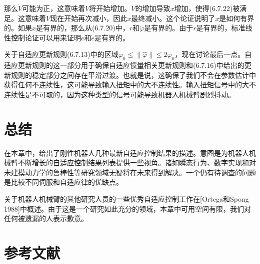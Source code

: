 \documentclass[12pt,a4paper]{ctexart}
\begin{document}
那么$\dot{V}$可能为正，这意味着$V$将开始增加。$V$的增加导致$x$增加，使得(6.7.22)被满足。这意味着$V$现在开始再次减小，因此$x$最终减小。这个论证说明了$x$是如何有界的。如果$x$是有界的，那么从(6.7.20)中，$r$和$\tilde{\varphi}$是有界的。由于$r$是有界的，标准线性控制论证可以用来证明$e$和$\dot{e}$是有界的。

关于自适应更新规则(6.7.13)中的区域$\varphi_0 \leq \|\hat{\varphi}\| \leq 2\varphi_0$，现在讨论最后一点。自适应更新规则的这一部分用于确保自适应惯量相关更新规则和(6.7.16)中给出的更新规则的稳定部分之间存在平滑过渡。也就是说，这确保了我们不会在参数估计中获得任何不连续性，这可能导致输入扭矩中的大不连续性。输入扭矩信号中的大不连续性是不可取的，因为这种类型的信号可能导致机器人机械臂剧烈抖动。

\section{总结}\label{sec:summary}

在本章中，给出了刚性机器人几种最新自适应控制结果的描述。意图是为机器人机械臂不断增长的自适应控制结果列表提供一些视角。诸如瞬态行为、数字实现和对未建模动力学的鲁棒性等研究领域无疑将在未来得到解决。一个仍有待调查的问题是比较不同伺服和自适应律的优缺点。

关于机器人机械臂的其他研究人员的一些优秀自适应控制工作在[Ortega和Spong 1988]中概述。由于这是一个研究如此充分的领域，本章中可用空间有限，我们对任何被遗漏的人表示歉意。

\section*{参考文献}
\end{document}
